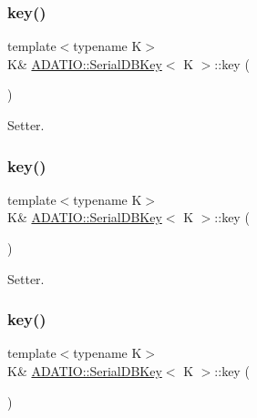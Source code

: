 \subsubsection{\texorpdfstring{key()}{key()}\hspace{0.1cm}{\footnotesize\ttfamily [1/6]}}
{\footnotesize\ttfamily template$<$typename K$>$ \\
K\& \mbox{\hyperlink{classADATIO_1_1SerialDBKey}{A\+D\+A\+T\+I\+O\+::\+Serial\+D\+B\+Key}}$<$ K $>$\+::key (\begin{DoxyParamCaption}{ }\end{DoxyParamCaption})\hspace{0.3cm}{\ttfamily [inline]}}



Setter. 

\mbox{\label{classADATIO_1_1SerialDBKey_a9dc566bd8bc83d98d4438d220012648a}} 
\subsubsection{\texorpdfstring{key()}{key()}\hspace{0.1cm}{\footnotesize\ttfamily [2/6]}}
{\footnotesize\ttfamily template$<$typename K$>$ \\
K\& \mbox{\hyperlink{classADATIO_1_1SerialDBKey}{A\+D\+A\+T\+I\+O\+::\+Serial\+D\+B\+Key}}$<$ K $>$\+::key (\begin{DoxyParamCaption}{ }\end{DoxyParamCaption})\hspace{0.3cm}{\ttfamily [inline]}}



Setter. 

\mbox{\label{classADATIO_1_1SerialDBKey_a9dc566bd8bc83d98d4438d220012648a}} 
\subsubsection{\texorpdfstring{key()}{key()}\hspace{0.1cm}{\footnotesize\ttfamily [3/6]}}
{\footnotesize\ttfamily template$<$typename K$>$ \\
K\& \mbox{\hyperlink{classADATIO_1_1SerialDBKey}{A\+D\+A\+T\+I\+O\+::\+Serial\+D\+B\+Key}}$<$ K $>$\+::key (\begin{DoxyParamCaption}{ }\end{DoxyParamCaption})\hspace{0.3cm}{\ttfamily [inline]}}



